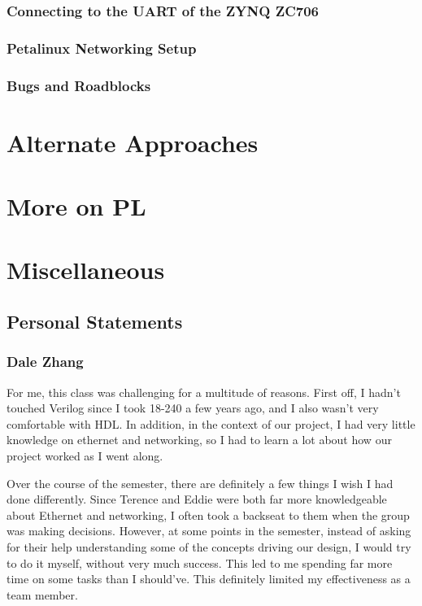 \documentclass[12pt]{report}
\begin{document}
\subsection{Connecting to the UART of the ZYNQ ZC706}
\subsection{Petalinux Networking Setup}
\subsection{Bugs and Roadblocks}
\chapter{Alternate Approaches}

\chapter{More on PL}

\chapter{Miscellaneous}
\section{Personal Statements}
\subsection{Dale Zhang}
For me, this class was challenging for a multitude of reasons. First off, I hadn't touched Verilog since I took 18-240 a few years ago, and I also wasn't very comfortable with HDL. In addition, in the context of our project, I had very little knowledge on ethernet and networking, so I had to learn a lot about how our project worked as I went along.

Over the course of the semester, there are definitely a few things I wish I had done differently. Since Terence and Eddie were both far more knowledgeable about Ethernet and networking, I often took a backseat to them when the group was making decisions. However, at some points in the semester, instead of asking for their help understanding some of the concepts driving our design, I would try to do it myself, without very much success. This led to me spending far more time on some tasks than I should've. This definitely limited my effectiveness as a team member.
\end{document}
